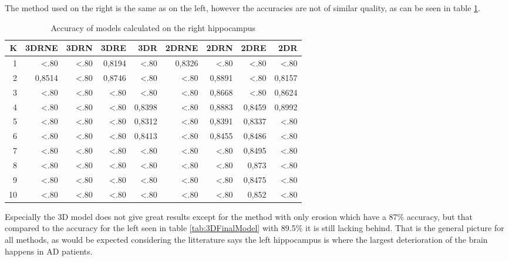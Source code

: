 
The method used on the right is the same as on the left, however the accuracies are not of similar quality, as can be seen in table \ref{tab:RightModels}.
\begin{table}[H]
  \centering
    \begin{tabular}{|r|r|r|r|r|r|r|r|r|}
     \hline
    K     & 3DRNE & 3DRN  & 3DRE  & 3DR   & 2DRNE & 2DRN  & 2DRE  & 2DR \\  \hline
    1     & <.80  & <.80  & 0,8194 & <.80  & 0,8326 & <.80  & <.80  & <.80 \\  \hline
    2     & 0,8514 & <.80  & 0,8746 & <.80  & <.80  & 0,8891 & <.80  & 0,8157 \\ \hline
    3     & <.80  & <.80  & <.80  & <.80  & <.80  & 0,8668 & <.80  & 0,8624 \\ \hline
    4     & <.80  & <.80  & <.80  & 0,8398 & <.80  & 0,8883 & 0,8459 & 0,8992 \\ \hline
    5     & <.80  & <.80  & <.80  & 0,8312 & <.80  & 0,8391 & 0,8337 & <.80 \\ \hline
    6     & <.80  & <.80  & <.80  & 0,8413 & <.80  & 0,8455 & 0,8486 & <.80 \\ \hline
    7     & <.80  & <.80  & <.80  & <.80  & <.80  & <.80  & 0,8495 & <.80 \\ \hline
    8     & <.80  & <.80  & <.80  & <.80  & <.80  & <.80  & 0,873 & <.80 \\ \hline
    9     & <.80  & <.80  & <.80  & <.80  & <.80  & <.80  & 0,8475 & <.80 \\ \hline
    10    & <.80  & <.80  & <.80  & <.80  & <.80  & <.80  & 0,852 & <.80 \\ \hline
    \end{tabular}%
    \caption{Accuracy of models calculated on the right hippocampus}\label{tab:RightModels}%
\end{table}%
Especially the 3D model does not give great results except for the method with only erosion which have a 87\% accuracy, but that compared to the accuracy for the left seen in table \ref{tab:3DFinalModel} with 89.5\% it is still lacking behind. That is the general picture for all methods, as would be expected considering  the litterature says the left hippocampus is where the largest deterioration of the brain happens in AD patients.













